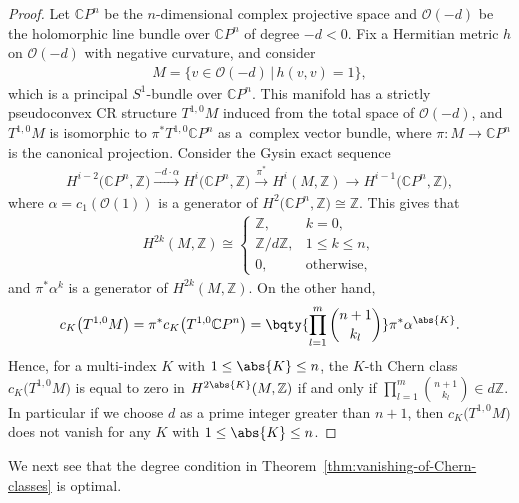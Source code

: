 \documentclass[pdftex]{sigma}
\numberwithin{equation}{section}
\begin{document}
\begin{proof}Let $\mathbb{C}P^{n}$ be the $n$-dimensional complex projective space and $\mathcal{O}(- d)$ be the holomorphic line bundle over $\mathbb{C}P^{n}$ of degree $- d < 0$. Fix a Hermitian metric $h$ on $\mathcal{O}(- d)$ with negative curvature, and consider
\begin{gather*}
M = \big\{v \in \mathcal{O}(- d) \,|\, h(v, v) = 1\big\},
\end{gather*}
which is a principal $S^{1}$-bundle over $\mathbb{C}P^{n}$. This manifold has a strictly pseudoconvex CR structure $T^{1, 0} M$ induced from the total space of $\mathcal{O}(- d)$, and $T^{1, 0} M$ is isomorphic to $\pi^{*} T^{1, 0} \mathbb{C}P^{n}$ as a~complex vector bundle, where $\pi \colon M \to \mathbb{C}P^{n}$ is the canonical projection. Consider the Gysin exact sequence
\begin{gather*}
H^{i - 2}\big(\mathbb{C}P^{n}, \mathbb{Z}\big) \xrightarrow{- d \cdot \alpha}H^{i}\big(\mathbb{C}P^{n}, \mathbb{Z}\big) \xrightarrow{\pi^{*}} H^{i}(M, \mathbb{Z}) \rightarrow H^{i - 1}\big(\mathbb{C}P^{n}, \mathbb{Z}\big),
\end{gather*}
where $\alpha = c_{1}(\mathcal{O}(1))$ is a generator of $H^{2}\big(\mathbb{C}P^{n}, \mathbb{Z}\big) \cong \mathbb{Z}$. This gives that
\begin{gather*}
H^{2 k}(M, \mathbb{Z})\cong\begin{cases}
\mathbb{Z}, & k = 0, \\
\mathbb{Z} / d \mathbb{Z}, & 1 \leq k \leq n, \\
0, & \text{otherwise},
\end{cases}
\end{gather*}
and $\pi^{*} \alpha^{k}$ is a generator of $H^{2 k}(M, \mathbb{Z})$. On the other hand,
\begin{gather*}
c_{K}\big(T^{1,0}M\big)= \pi^{*} c_{K}\big(T^{1, 0} \mathbb{C}P^{n}\big) = \bqty{\prod_{l = 1}^{m} \binom{n + 1}{k_{l}}} \pi^{*} \alpha^{\abs{K}}.
\end{gather*}
Hence, for a multi-index $K$ with $1 \leq \abs{K} \leq n$, the $K$-th Chern class $c_{K}\big(T^{1,0}M\big)$ is equal to zero in $H^{2 \abs{K}}(M, \mathbb{Z})$ if and only if $\prod\limits_{l = 1}^{m} \binom{n + 1}{k_{l}} \in d \mathbb{Z}$. In particular if we choose $d$ as a prime integer greater than $n + 1$, then $c_{K}\big(T^{1,0}M\big)$ does not vanish for any $K$ with $1 \leq \abs{K} \leq n$.
\end{proof}

We next see that the degree condition in Theorem~\ref{thm:vanishing-of-Chern-classes} is optimal.
\end{document}
